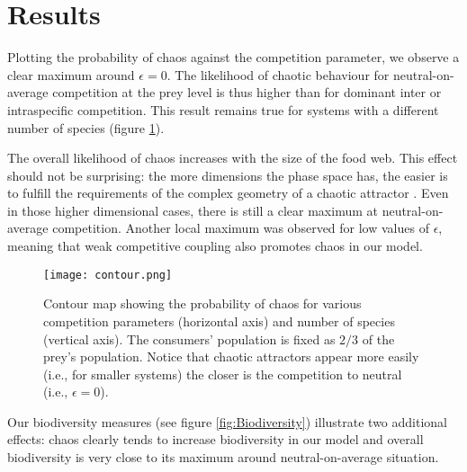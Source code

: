 \section{Results}
\label{sec:Results}
Plotting the probability of chaos against the competition parameter, we observe a clear maximum around $ \epsilon = 0 $. The likelihood of chaotic behaviour for neutral-on-average competition at the prey level is thus higher than for dominant inter or intraspecific competition. This result remains true for systems with a different number of species (figure \ref{fig:Contour}).

The overall likelihood of chaos increases with the size of the food web. This effect should not be surprising: the more dimensions the phase space has, the easier is to fulfill the requirements of the complex geometry of a chaotic attractor \citep{Strogatz1994}. Even in those higher dimensional cases, there is still a clear maximum at neutral-on-average competition. Another local maximum was observed for low values of $ \epsilon $, meaning that weak competitive coupling also promotes chaos in our model.

\begin{figure}
	\begin{center}
		\texttt{[image: contour.png]}
	\end{center}
	\caption{Contour map showing the probability of chaos for various competition parameters (horizontal axis) and number of species (vertical axis). The consumers' population is fixed as $ 2/3 $ of the prey's population. Notice that chaotic attractors appear more easily (i.e., for smaller systems) the closer is the competition to neutral (i.e., $ \epsilon = 0 $).}
	\label{fig:Contour}
\end{figure}

Our biodiversity measures (see figure \ref{fig:Biodiversity}) illustrate two additional effects: chaos clearly tends to increase biodiversity in our model and overall biodiversity is very close to its maximum around neutral-on-average situation.

